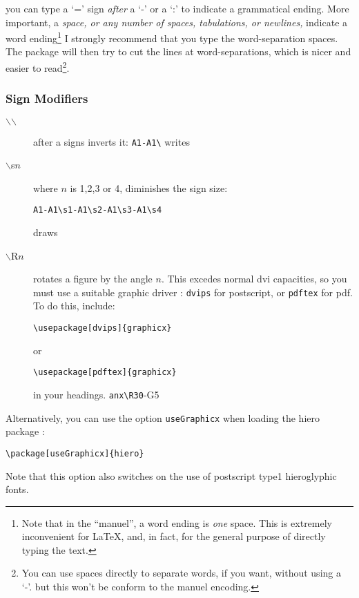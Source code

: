 \documentclass[final]{article}
\def\Backslash{$\backslash$}
\begin{document}
you can type a `=' sign {\em after\/}  a `-' or a `:' to indicate a
grammatical ending. More important, a {\em space, or any number of
  spaces, tabulations, or newlines,}  indicate a word
ending\footnote{Note that in the ``manuel'', a word ending is {\em
    one\/} space. This is extremely inconvenient for \LaTeX{}, and, in
  fact, for the general purpose of directly typing the text.}
I strongly recommend that you type the word-separation spaces. The
package will then try to cut the lines at word-separations, which is
nicer and easier to read\footnote{You can use spaces directly to
  separate words, if you want, without using a `-'. but this won't be
  conform to the manuel encoding.}.


\subsubsection{Sign Modifiers}

\begin{description}
\item[\Backslash{}\Backslash{}] after a signs inverts it:
  \verb|A1-A1\| writes 
  \begin{hieroglyph}{\leavevmode {}\HinterSignsSpace
{}}\end{hieroglyph}

\item[\Backslash{}s$n$] where $n$ is 1,2,3 or 4, diminishes the 
  sign size: 
  \begin{center}
\verb/A1-A1\s1-A1\s2-A1\s3-A1\s4/ 
  \end{center}
draws
  \begin{hieroglyph}{\leavevmode {}\HinterSignsSpace
{}\HinterSignsSpace
{}\HinterSignsSpace
{}\HinterSignsSpace
{}}\end{hieroglyph}
  
\item[\Backslash{}R$n$] rotates a figure by the angle $n$. This
  excedes normal dvi capacities, so you must use a suitable graphic
  driver : \texttt{dvips}  for postscript, or \texttt{pdftex} for pdf.
To do this, include:
\begin{verbatim}
\usepackage[dvips]{graphicx}
\end{verbatim}
or 
\begin{verbatim}
\usepackage[pdftex]{graphicx}
\end{verbatim}
in your headings.
  \verb|anx\R30|-G5
  \begin{hieroglyph}{\leavevmode {}\HinterSignsSpace
{}}\end{hieroglyph}
\end{description}
Alternatively, you can use the option \verb|useGraphicx| when loading
the hiero package :
\begin{verbatim}
\package[useGraphicx]{hiero}
\end{verbatim}
Note that this option also switches on the use of postscript type1
hieroglyphic fonts.
\end{document}
